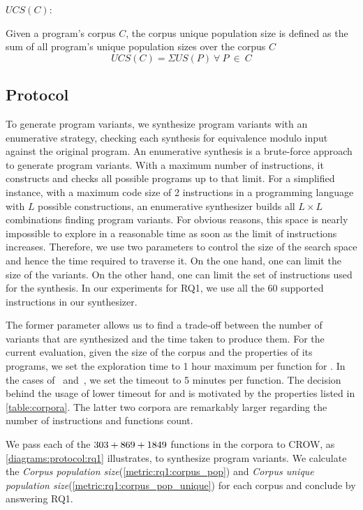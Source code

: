 \begin{metric}{\corpusuniquepopulationsizename$UCS(C)$:}\label{metric:rq1:corpus_pop_unique}

    Given a program's corpus $C$, the corpus unique population size is defined as the sum of all program's unique population sizes over the corpus $C$\\
    $$
    UCS(C)=\Sigma{US(P)}\ \forall\ P\ \in\ C
    $$
\end{metric}


\subsection*{Protocol}
To generate program variants, we synthesize program variants with an enumerative strategy, checking each synthesis for equivalence modulo input \cite{Li2018} against the original program. An enumerative synthesis is a brute-force approach to generate program variants. With a maximum number of instructions, it constructs and checks all possible programs up to that limit. For a simplified instance, with a maximum code size of 2 instructions in a programming language with $L$ possible constructions, an enumerative synthesizer builds all $L\times L$ combinations finding program variants. For obvious reasons, this space is nearly impossible to explore in a reasonable time as soon as the limit of instructions increases.
Therefore, we use two parameters to control the size of the search space and hence the time required to traverse it.
On the one hand, one can limit the size of the variants. On the other hand, one can limit the set of instructions used for the synthesis. In our experiments for RQ1, we use all the $60$ supported instructions in our synthesizer.


The former parameter allows us to find a trade-off between the number of variants that are synthesized and the time taken to produce them. For the current evaluation, given the size of the corpus and the properties of its programs, we set the exploration time to 1 hour maximum per function for \corpusrosetta. In the cases of \corpussodium\ and\ \corpusqrcode, we set the timeout to 5 minutes per function. The decision behind the usage of lower timeout for \corpussodium
and \corpussodium is motivated by the properties listed in \autoref{table:corpora}. The latter two corpora are remarkably larger regarding the number of instructions and functions count. 

We pass each of the $303 + 869 + 1849$ functions in the corpora to CROW, as \autoref{diagrams:protocol:rq1} illustrates, to synthesize program variants. We calculate the \emph{Corpus population size}(\autoref{metric:rq1:corpus_pop}) and \emph{Corpus unique population size}(\autoref{metric:rq1:corpus_pop_unique}) for each corpus and conclude by answering RQ1.
